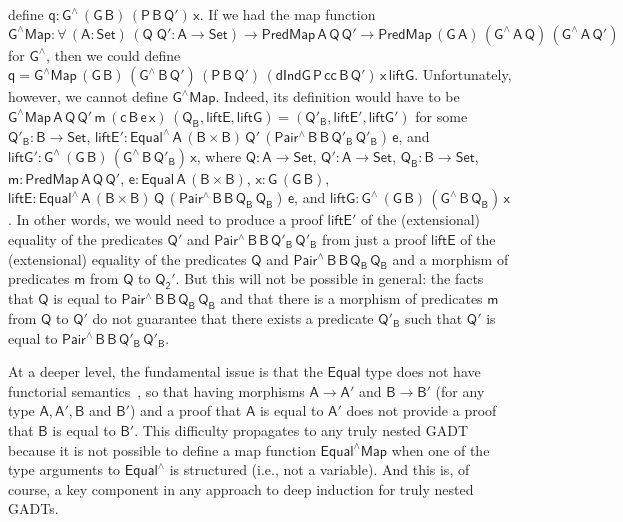 \documentclass[9pt]{entcs}
\begin{document}
define $\mathsf{q : G^{\wedge}\,(G\,B)\,(P\,B\,Q')\,x}$.  If we had
the map function $\mathsf{G^\wedge Map : \forall\, (A : Set)\, (Q\;Q'
  : A \to Set) \to PredMap\,A\,Q\,Q' \to
  PredMap\,(G\,A)\,(G^{\wedge}\,A\,Q)\,(G^{\wedge}\,A\,Q')}$ for
$\mathsf{G^{\wedge}}$, then we could define $\mathsf{q = G^\wedge
  Map\,(G\,B)\,(G^{\wedge}\,B\,Q')\,(P\,B\,Q')\,
  (dIndG\,P\,cc\,B\,Q')\,x\,liftG}$.  Unfortunately, however, we
cannot define $\mathsf{G^\wedge Map}$. Indeed, its definition would
have to be $ \mathsf{G^\wedge Map\,A\,Q\,Q'\,m\,(c\,B\,e\,x)\,(Q_B,
  liftE, liftG) = (Q'_B, liftE', liftG')}$ for some $\mathsf{Q'_B : B
  \to Set}$, $\mathsf{liftE' : Equal^{\wedge}\,A\,(B \times
  B)\,Q'\,(Pair^{\wedge}\,B\,B\,Q'_B\,Q'_B)\,e}$, and $\mathsf{liftG'
  : G^{\wedge}\,(G\,B)\,(G^{\wedge}\,B\,Q'_B)\,x}$, where $\mathsf{Q :
  A \to Set}$, $\mathsf{Q' : A \to Set}$, $\mathsf{Q_B : B \to Set}$,
$\mathsf{m : PredMap\,A\,Q\,Q'}$, $\mathsf{e : Equal\,A\,(B \times
  B)}$, $\mathsf{x : G\,(G\,B)}$, $\mathsf{liftE :
  Equal^{\wedge}\,A\,(B \times
  B)\,Q\,(Pair^{\wedge}\,B\,B\,Q_B\,Q_B)\,e}$, and $\mathsf{liftG :
  G^{\wedge}\,(G\,B)\,(G^{\wedge}\,B\,Q_B)\,x}$. In other words, we
would need to produce a proof $\mathsf{liftE'}$ of the (extensional)
equality of the predicates $\mathsf{Q'}$ and
$\mathsf{Pair^{\wedge}\,B\,B\,Q'_B\,Q'_B}$ from just a proof
$\mathsf{liftE}$ of the (extensional) equality of the predicates
$\mathsf{Q}$ and $\mathsf{Pair^{\wedge}\,B\,B\,Q_B\,Q_B}$ and a
morphism of predicates $\mathsf{m}$ from $\mathsf{Q}$ to
$\mathsf{Q_2'}$.
But this will not be possible in general: the facts that $\mathsf{Q}$
is equal to $\mathsf{Pair^{\wedge}\,B\,B\,Q_B\,Q_B}$ and that there is
a morphism of predicates $\mathsf{m}$ from $\mathsf{Q}$ to
$\mathsf{Q'}$ do not guarantee that there exists a predicate
$\mathsf{Q'_B}$ such that $\mathsf{Q'}$ is equal to
$\mathsf{Pair^{\wedge}\,B\,B\,Q'_B\,Q'_B}$.

At a deeper level, the fundamental issue is that the $\mathsf{Equal}$
type does not have functorial semantics~\cite{jgj21}, so that having
morphisms $\mathsf{A \to A'}$ and $\mathsf{B \to B'}$ (for any type
$\mathsf{A, A', B}$ and $\mathsf{B'}$) and a proof that $\mathsf{A}$
is equal to $\mathsf{A'}$ does not provide a proof that $\mathsf{B}$
is equal to $\mathsf{B'}$. This difficulty propagates to any truly
nested GADT because it is not possible to define a map function
$\mathsf{Equal^\wedge Map}$
when one of the
type arguments to $\mathsf{Equal^\wedge}$ is structured (i.e., not a
variable). And this is, of course, a key component in any approach to
deep induction for truly nested GADTs.
\end{document}

